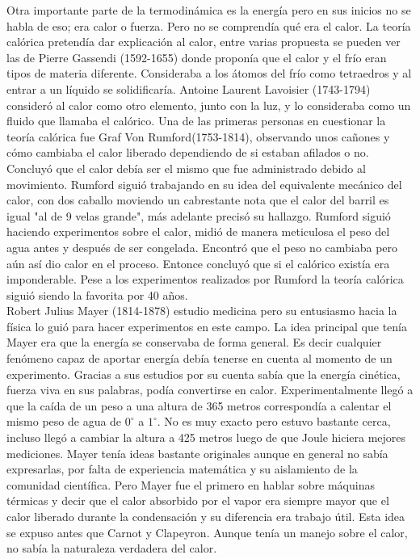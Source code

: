 Otra importante parte de la termodinámica es la energía pero en sus inicios no se habla de eso; era calor o fuerza. Pero no se comprendía qué era el calor. La teoría calórica pretendía dar explicación al calor, entre varias propuesta se pueden ver las de Pierre Gassendi (1592-1655) donde proponía que el calor y el frío eran tipos de materia diferente. Consideraba a los átomos del frío como tetraedros y al entrar a un líquido se solidificaría. Antoine Laurent Lavoisier (1743-1794) consideró al calor como otro elemento, junto con la luz, y lo consideraba como un fluido que llamaba el calórico. Una de las primeras personas en cuestionar la teoría calórica fue Graf Von Rumford(1753-1814), observando unos cañones y cómo cambiaba el calor liberado dependiendo de si estaban afilados  o no. Concluyó que el calor debía ser el mismo que fue administrado debido al movimiento. Rumford siguió trabajando en su idea del equivalente mecánico del calor, con dos caballo moviendo un cabrestante nota que el calor del barril es igual "al de 9 velas grande", más adelante precisó su hallazgo. Rumford siguió haciendo experimentos sobre el calor, midió de manera meticulosa el peso del agua antes y después de ser congelada. Encontró que el peso no cambiaba pero aún así dio calor en el proceso. Entonce concluyó que si el calórico existía era imponderable. Pese a los experimentos realizados por Rumford la teoría calórica siguió siendo la favorita por 40 años.	
\\
Robert Julius Mayer (1814-1878) estudio medicina pero su entusiasmo hacia la física lo guió para hacer experimentos en este campo. La idea principal que tenía Mayer era que la energía se conservaba de forma general. Es decir cualquier fenómeno capaz de aportar energía debía tenerse en cuenta al momento de un experimento. Gracias a sus estudios por su cuenta sabía que la energía cinética, fuerza viva en sus  palabras, podía convertirse en calor. Experimentalmente llegó a que la caída de un peso a una altura  de 365 metros correspondía a calentar el mismo peso de agua de $0^{\circ}$ a $1^{\circ}$. No es muy exacto pero estuvo bastante cerca, incluso llegó a cambiar la altura a 425 metros luego de que Joule hiciera mejores mediciones. Mayer tenía ideas bastante originales aunque en general no sabía expresarlas, por falta de experiencia matemática y su aislamiento de la comunidad científica. Pero Mayer fue el primero en hablar sobre máquinas térmicas y decir que el calor absorbido por el vapor era siempre mayor que el calor liberado durante la condensación y su diferencia era trabajo útil. Esta idea se expuso antes que Carnot y Clapeyron. Aunque tenía un manejo sobre el calor, no sabía la naturaleza verdadera del calor.
